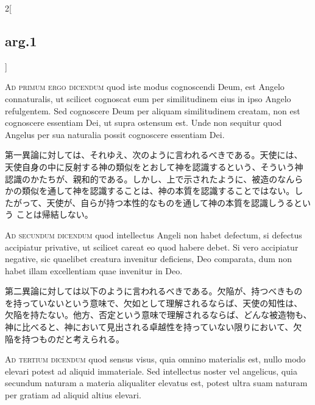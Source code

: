\documentclass[paper=a4paper,fontsize=10pt,jafontsize=9pt,titlepage]{jlreq}
\begin{document}
\begin{paracol}{2}[\subsection{arg.1}]
\switchcolumn*[\subsection{ad.1}]

{\scshape Ad primum ergo dicendum} quod iste modus cognoscendi Deum, est
Angelo connaturalis, ut scilicet cognoscat eum per similitudinem eius
in ipso Angelo refulgentem. Sed cognoscere Deum per aliquam
similitudinem creatam, non est cognoscere essentiam Dei, ut supra
ostensum est. Unde non sequitur quod Angelus per sua naturalia possit
cognoscere essentiam Dei.

\switchcolumn

第一異論に対しては、それゆえ、次のように言われるべきである。天使には、
天使自身の中に反射する神の類似をとおして神を認識するという、そういう神
認識のかたちが、親和的である。しかし、上で示されたように、被造のなんら
かの類似を通して神を認識することは、神の本質を認識することではない。し
たがって、天使が、自らが持つ本性的なものを通して神の本質を認識しうるという
ことは帰結しない。

\switchcolumn*[\subsection{ad.2}]

{\scshape Ad secundum dicendum} quod intellectus Angeli non habet defectum,
si defectus accipiatur privative, ut scilicet careat eo quod habere
debet. Si vero accipiatur negative, sic quaelibet creatura invenitur
deficiens, Deo comparata, dum non habet illam excellentiam quae
invenitur in Deo.

\switchcolumn

第二異論に対しては以下のように言われるべきである。欠陥が、持つべきもの
を持っていないという意味で、欠如として理解されるならば、天使の知性は、
欠陥を持たない。他方、否定という意味で理解されるならば、どんな被造物も、
神に比べると、神において見出される卓越性を持っていない限りにおいて、欠
陥を持つものだと考えられる。

\switchcolumn*[\subsection{ad.3}]

{\scshape Ad tertium dicendum} quod sensus visus, quia omnino materialis
est, nullo modo elevari potest ad aliquid immateriale. Sed intellectus
noster vel angelicus, quia secundum naturam a materia aliqualiter
elevatus est, potest ultra suam naturam per gratiam ad aliquid altius
elevari.


\end{paracol}
\end{document}
